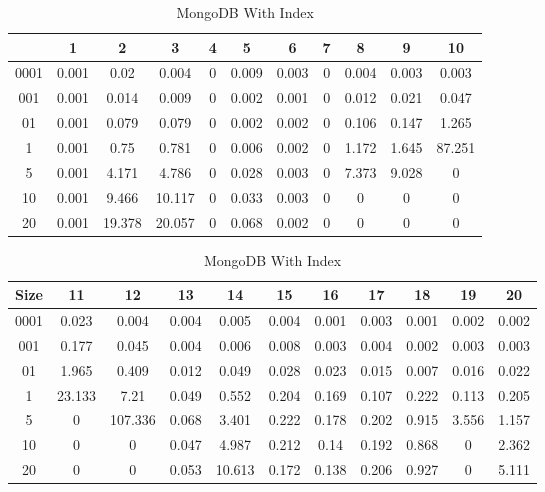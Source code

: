 \begin{center}
\begin{table} [ht]
\tiny
\caption{MongoDB With Index}
\label{mongodb-query-result-table}
\begin{tabular}{|c|c|c|c|c|c|c|c|c|c|c| } 
    &  1 & 2 & 3 & 4 & 5 & 6 & 7 & 8 & 9 & 10 \\
 \hline
0001 & 0.001 & 0.02 & 0.004 & 0 & 0.009 & 0.003 & 0 & 0.004 & 0.003 & 0.003	\\
001 & 0.001 & 0.014 & 0.009 & 0 & 0.002 & 0.001 & 0 & 0.012 & 0.021 & 0.047	\\
01 & 0.001 & 0.079 & 0.079 & 0 & 0.002 & 0.002 & 0 & 0.106 & 0.147 & 1.265	\\
1 & 0.001 & 0.75 & 0.781 & 0 & 0.006 & 0.002 & 0 & 1.172 & 1.645 & 87.251	\\
5 & 0.001 & 4.171 & 4.786 & 0 & 0.028 & 0.003 & 0 & 7.373 & 9.028 & 0	\\
10 & 0.001 & 9.466 & 10.117 & 0 & 0.033 & 0.003 & 0 & 0 & 0 & 0	\\
20 & 0.001 & 19.378 & 20.057 & 0 & 0.068 & 0.002 & 0 & 0 & 0 & 0	\\

\end{tabular}
\begin{tabular}{|c|c|c|c|c|c|c|c|c|c|c| } 
Size & 11 & 12 & 13 & 14 & 15 & 16 & 17 & 18 & 19 & 20	\\
\hline
0001 & 0.023 & 0.004 & 0.004 & 0.005 & 0.004 & 0.001 & 0.003 & 0.001 & 0.002 & 0.002	\\
001 & 0.177 & 0.045 & 0.004 & 0.006 & 0.008 & 0.003 & 0.004 & 0.002 & 0.003 & 0.003	\\
01 & 1.965 & 0.409 & 0.012 & 0.049 & 0.028 & 0.023 & 0.015 & 0.007 & 0.016 & 0.022	\\
1 & 23.133 & 7.21 & 0.049 & 0.552 & 0.204 & 0.169 & 0.107 & 0.222 & 0.113 & 0.205	\\
5 & 0 & 107.336 & 0.068 & 3.401 & 0.222 & 0.178 & 0.202 & 0.915 & 3.556 & 1.157	\\
10 & 0 & 0 & 0.047 & 4.987 & 0.212 & 0.14 & 0.192 & 0.868 & 0 & 2.362	\\
20 & 0 & 0 & 0.053 & 10.613 & 0.172 & 0.138 & 0.206 & 0.927 & 0 & 5.111	\\


\end{tabular}
\end{table}




\end{center}
